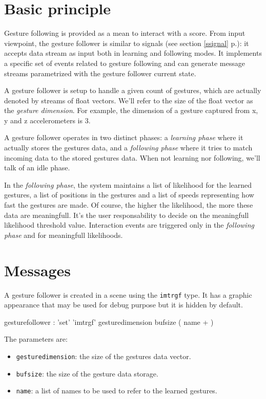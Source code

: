 \documentclass[a4paper,twoside]{report}
\newcommand{\sublevel}[1]	{\section{#1}}
\newcommand{\fullref}[1]	{\ref{#1} p.\pageref{#1}}
\newcommand{\OSC}[1]		{\texttt{#1}}
\begin{document}
\sublevel{Basic principle}\label{gfbasic}
Gesture following is provided as a mean to interact with a score. From input viewpoint, the gesture follower is similar to signals (see section \fullref{ssignal}): it accepts data stream as input both in learning and following modes. It implements a specific set of events related to gesture following and can generate message streams parametrized with the gesture follower current state.

A gesture follower is setup to handle a given count of gestures, which are actually denoted by streams of float vectors. We'll refer to the size of the float vector as the \emph{gesture dimension}. For example, the dimension of a gesture captured from x, y and z accelerometers is 3.

A gesture follower operates in two distinct phases: a \emph{learning phase} where it actually stores the gestures data, and a \emph{following phase} where it tries to match incoming data to the stored gestures data. When not learning nor following, we'll talk of an idle phase. 

In the \emph{following phase}, the system maintains a list of likelihood for the learned gestures, a list of positions in the gestures and a list of speeds representing how fast the gestures are made. Of course, the higher the likelihood, the more these data are meaningfull. It's the user responsability to decide on the meaningfull likelihood threshold value. Interaction events are triggered only in the \emph{following phase} and for meaningfull likelihoods.

\sublevel{Messages}\label{gfmessages}
A gesture follower is created in a scene using the \OSC{imtrgf} type. It has a graphic appearance that may be used for debug purpose but it is hidden by default.

\begin{rail}
gesturefollower : 'set' 'imtrgf' gesturedimension bufsize ( name + )
\end{rail}

The parameters are:
\begin{itemize}
\item \OSC{gesturedimension}: the size of the gestures data vector.
\item \OSC{bufsize}: the size of the gesture data storage.
\item \OSC{name}: a list of names to be used to refer to the learned gestures.
\end{itemize}
\end{document}
